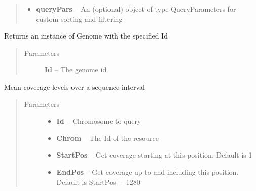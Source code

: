 \documentclass[letterpaper,10pt,english]{sphinxmanual}
\begin{document}
\begin{fulllineitems}
\begin{fulllineitems}
\begin{quote}
\begin{description}
\begin{itemize}
\item {} 
\textbf{queryPars} -- An (optional) object of type QueryParameters for custom sorting and filtering

\end{itemize}

\end{description}\end{quote}

\end{fulllineitems}


\begin{fulllineitems}
\label{Available modules:BaseSpacePy.api.BaseSpaceAPI.BaseSpaceAPI.getGenomeById}
Returns an instance of Genome with the specified Id
\begin{quote}\begin{description}
\item[{Parameters}] \leavevmode
\textbf{Id} -- The genome id

\end{description}\end{quote}

\end{fulllineitems}


\begin{fulllineitems}
\label{Available modules:BaseSpacePy.api.BaseSpaceAPI.BaseSpaceAPI.getIntervalCoverage}
Mean coverage levels over a sequence interval
\begin{quote}\begin{description}
\item[{Parameters}] \leavevmode\begin{itemize}
\item {} 
\textbf{Id} -- Chromosome to query

\item {} 
\textbf{Chrom} -- The Id of the resource

\item {} 
\textbf{StartPos} -- Get coverage starting at this position. Default is 1

\item {} 
\textbf{EndPos} -- Get coverage up to and including this position. Default is StartPos + 1280


\end{itemize}
\end{description}
\end{quote}
\end{fulllineitems}
\end{fulllineitems}
\end{document}
